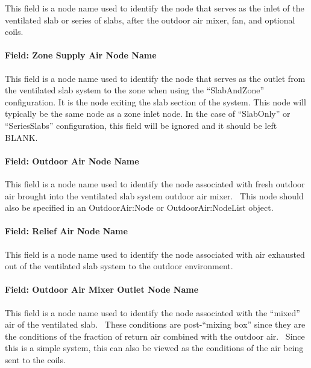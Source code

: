 This field is a node name used to identify the node that serves as the inlet of the ventilated slab or series of slabs, after the outdoor air mixer, fan, and optional coils.

\paragraph{Field: Zone Supply Air Node Name}\label{field-zone-supply-air-node-name-000}

This field is a node name used to identify the node that serves as the outlet from the ventilated slab system to the zone when using the ``SlabAndZone'' configuration. It is the node exiting the slab section of the system. This node will typically be the same node as a zone inlet node. In the case of ``SlabOnly'' or ``SeriesSlabs'' configuration, this field will be ignored and it should be left BLANK.

\paragraph{Field: Outdoor Air Node Name}\label{field-outdoor-air-node-name}

This field is a node name used to identify the node associated with fresh outdoor air brought into the ventilated slab system outdoor air mixer.~ This node should also be specified in an OutdoorAir:Node or OutdoorAir:NodeList object.

\paragraph{Field: Relief Air Node Name}\label{field-relief-air-node-name}

This field is a node name used to identify the node associated with air exhausted out of the ventilated slab system to the outdoor environment.

\paragraph{Field: Outdoor Air Mixer Outlet Node Name}\label{field-outdoor-air-mixer-outlet-node-name}

This field is a node name used to identify the node associated with the ``mixed'' air of the ventilated slab.~ These conditions are post-``mixing box'' since they are the conditions of the fraction of return air combined with the outdoor air.~ Since this is a simple system, this can also be viewed as the conditions of the air being sent to the coils.


